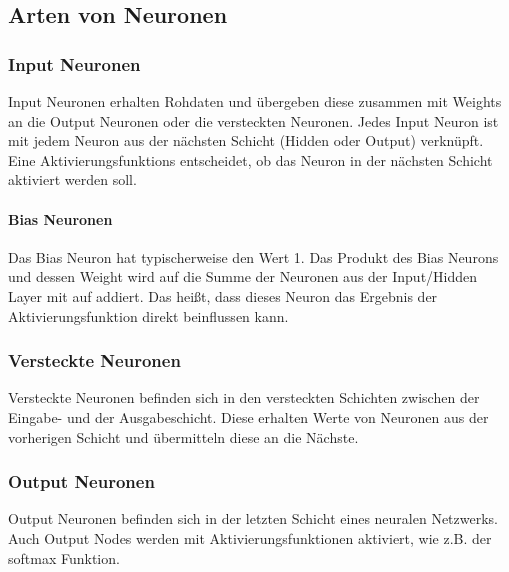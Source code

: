 \subsection{Arten von Neuronen}\label{subsec:neuronen:arten_von_neuronen}
\subsubsection{Input Neuronen}
Input Neuronen erhalten Rohdaten und übergeben diese zusammen mit Weights an die Output Neuronen oder die versteckten Neuronen. Jedes Input Neuron ist mit jedem Neuron aus der nächsten Schicht 
(Hidden oder Output) verknüpft. Eine Aktivierungsfunktions entscheidet, ob das Neuron in der nächsten Schicht aktiviert werden soll. 
\paragraph{Bias Neuronen}
Das Bias Neuron hat typischerweise den Wert 1. Das Produkt des Bias Neurons und dessen Weight wird auf die Summe der Neuronen aus der Input/Hidden Layer mit auf addiert. Das heißt, dass dieses Neuron
das Ergebnis der Aktivierungsfunktion direkt beinflussen kann.
\subsubsection{Versteckte Neuronen}
Versteckte Neuronen befinden sich in den versteckten Schichten zwischen der Eingabe- und der Ausgabeschicht. Diese erhalten Werte von Neuronen aus der vorherigen Schicht und übermitteln diese an die Nächste.
\subsubsection{Output Neuronen}
Output Neuronen befinden sich in der letzten Schicht eines neuralen Netzwerks. Auch Output Nodes werden mit Aktivierungsfunktionen aktiviert, wie z.B. der softmax Funktion.
